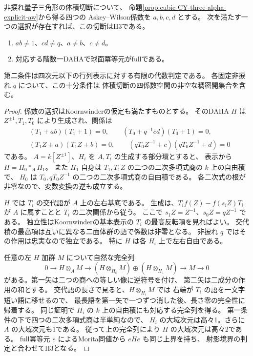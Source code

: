 \begin{proposition}\label{prop:cubic-CY-three-alpha-aw-smooth-open}
非捩れ量子三角形の体積切断について、
命題\ref{prop:cubic-CY-three-alpha-explicit-aw}から得る四つの
Askey--Wilson係数を $a,b,c,d$ とする。
次を満たす一つの選択が存在すれば、この切断はH3である。
\begin{enumerate}
\item $ab\ne1$、$cd\ne q$、$a\ne b$、$c\ne d$。
\item 対応する階数一DAHAで球面冪等元がfullである。
\end{enumerate}
第二条件は四次元以下の行列表示に対する有限の代数判定である。
各固定非捩れ $q$ について、この十分条件は
体積切断の四係数空間の非空な稠密開集合を含む。
\end{proposition}
\begin{proof}
係数の選択はKoornwinderの仮定も満たすものとする。
そのDAHA $H$ は $Z^{\pm1},T_1,T_0$ により生成され、関係は
\cite[式(3.1)--(3.4)]{KoornwinderRankOneAW}
\[
\begin{aligned}
 &(T_1+ab)(T_1+1)=0,\qquad (T_0+q^{-1}cd)(T_0+1)=0,\\
 &(T_1Z+a)(T_1Z+b)=0,\qquad
   (qT_0Z^{-1}+c)(qT_0Z^{-1}+d)=0
\end{aligned}
\]
である。
$A=k[Z^{\pm1}]$、$H_i$ を $A,T_i$ の生成する部分環とすると、
表示から $H=H_0*_A H_1$。
また $H_1$ 自身は $T_1,T_1Z$ の二つの二次多項式商の $k$ 上の自由積で、
$H_0$ は $T_0,qT_0Z^{-1}$ の二つの二次多項式商の自由積である。
各二次式の根が非零なので、変数変換の逆も成立する。

$H$ では $T_i$ の交代語が $A$ 上の左右基底である。
生成は、$T_i f(Z)-f(s_i Z)T_i$ が $A$ に属すことと
$T_i$ の二次関係から従う。
ここで $s_1Z=Z^{-1}$、$s_0Z=qZ^{-1}$ である。
独立性はKoornwinderの基本表示の $T_i$ の最高反転項を見ればよい。
交代積の最高項は互いに異なる二面体群の語で係数は非零となる。
非捩れ $q$ ではその作用は忠実なので独立である。
特に $H$ は各 $H_i$ 上で左右自由である。

任意の左 $H$ 加群 $M$ について自然な完全列
\[
 0\longrightarrow H\otimes_A M
 \longrightarrow (H\otimes_{H_0} M)\oplus (H\otimes_{H_1} M)
 \longrightarrow M\longrightarrow 0
\]
がある。第一矢は二つの商への等しい像に逆符号を付け、
第二矢は二成分の作用の和とする。
交代語の長さで見ると、$H\otimes_{H_i}M$ では
右端が $T_i$ の語を一文字短い語に移せるので、
最長語を第一矢で一つずつ消した後、長さ零の完全性に帰着する。
同じ証明で $H_i$ の $k$ 上の自由積にも対応する完全列を得る。
第一条件の下で四つの二次多項式商は半単純なので、
$H_i$ の大域次元は高々1。さらに $A$ の大域次元も1である。
従って上の完全列により $H$ の大域次元は高々2である。
full冪等元 $e$ によるMorita同値から $eHe$ も同じ上界を持ち、
射影境界の判定と合わせてH3となる。


\end{proof}
